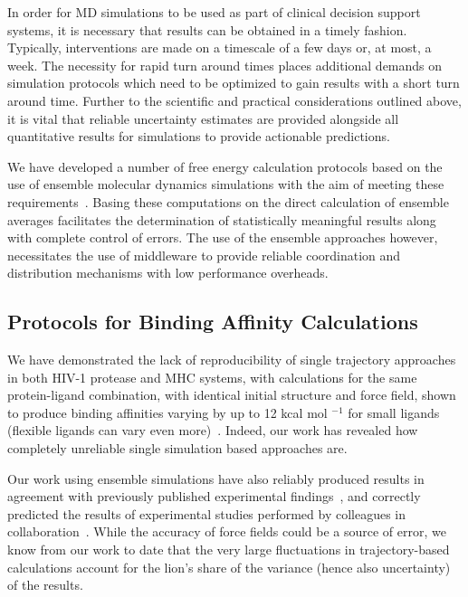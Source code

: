 \documentclass[conference]{IEEEtran}
\begin{document}
In order for MD simulations to be used as part of clinical decision support
systems, it is necessary that results can be obtained in a timely fashion.
Typically, interventions are made on a timescale of a few days or, at most, a
week. The necessity for rapid turn around times places additional demands on
simulation protocols which need to be optimized to gain results with a short
turn around time. Further to the scientific and practical considerations
outlined above, it is vital that reliable uncertainty estimates are
provided alongside all quantitative results for simulations to provide
actionable predictions.

We have developed a number of free energy calculation protocols based on the
use of ensemble molecular dynamics simulations with the aim of meeting these
requirements~\cite{Sadiq2008, Sadiq2010, Wan2017brd4, Wan2017trk}. Basing
these computations on the direct calculation of ensemble averages facilitates
the determination of statistically meaningful results along with complete
control of errors. The use of the ensemble approaches however, necessitates
the use of middleware to provide reliable coordination and distribution
mechanisms with low performance overheads.
%
%
%

%
\subsection{Protocols for Binding Affinity Calculations}

We have demonstrated the lack of reproducibility of single trajectory
approaches in both HIV-1 protease and MHC systems, with calculations for the
same protein-ligand combination, with identical initial structure and force
field, shown to produce binding affinities varying by up to 12 kcal mol
$^{-1}$ for small ligands (flexible ligands can vary even
more)~\cite{Wan2015, Sadiq2010, Wright2014}. Indeed, our work has revealed
how completely unreliable single simulation based approaches are.

Our work using ensemble simulations have also reliably produced results in
agreement with previously published experimental findings~\cite{Sadiq2010,
Wan2011, Wright2014, Bhati2017, Wan2017brd4, Wan2017trk}, and correctly
predicted the results of experimental studies performed by colleagues in
collaboration~\cite{Bunney2015}. While the accuracy of force fields could be a
source of error, we know from our work to date that the very large
fluctuations in trajectory-based calculations account for the lion’s share of
the variance (hence also uncertainty) of the results.
\end{document}
